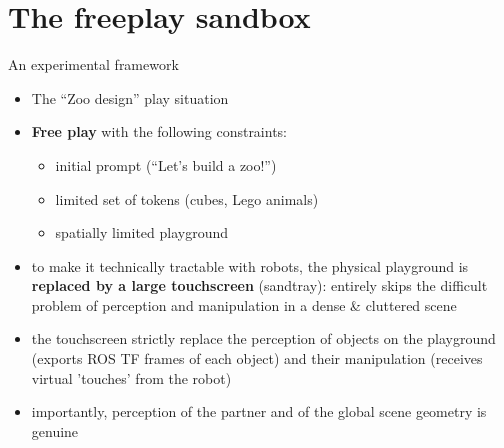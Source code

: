 \documentclass[compress]{beamer}
\begin{document}

\section{The freeplay sandbox}


\begin{frame}{An experimental framework}

    \begin{itemize}
        \item The ``Zoo design'' play situation
        \item {\bf Free play} with the following constraints:
            \begin{itemize}
                \item initial prompt (``Let's build a zoo!'')
                \item limited set of tokens (cubes, Lego animals)
                \item spatially limited playground
            \end{itemize}
        \item<2-> to make it technically tractable with robots, the physical
            playground is {\bf replaced by a large touchscreen} (sandtray): entirely
            skips the difficult problem of perception and manipulation in a
            dense \& cluttered scene
        \item<2-> the touchscreen strictly
            replace the perception of objects on the playground (exports
            ROS TF frames of each object) and their manipulation (receives
            virtual 'touches' from the robot)
        \item<2-> importantly, perception of the partner and of the global scene
            geometry is genuine
    \end{itemize}
\end{frame}






\end{document}
